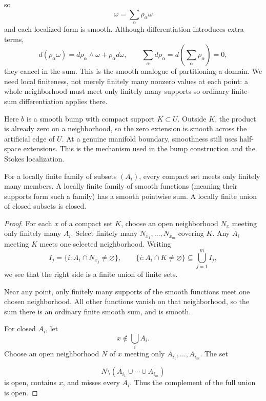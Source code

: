 so
\[
\omega=\sum_\alpha\rho_\alpha\omega
\]
 and each localized form is smooth.
Although differentiation introduces extra terms,
\[
d(\rho_\alpha\omega)=d\rho_\alpha\wedge\omega+\rho_\alpha d\omega,
\qquad \sum_\alpha d\rho_\alpha=d\left(\sum_\alpha\rho_\alpha\right)=0,
\]
they cancel in the sum. This is the smooth analogue of partitioning a
domain. We need local finiteness, not merely finitely many nonzero values
at each point: a whole neighborhood must meet only finitely many supports
so ordinary finite-sum differentiation applies there.

\begin{center}
\end{center}
Here $b$ is a smooth bump with compact support $K\subset U$.
Outside $K$, the product is already zero on a neighborhood, so the zero
extension is smooth across the artificial edge of $U$. At a genuine
manifold boundary, smoothness still uses half-space extensions. This is
the mechanism used in the bump construction and the Stokes localization.

\begin{lemma}\label{lem:local-finiteness}
For a locally finite family of subsets $(A_i)$, every compact set meets only
finitely many members. A locally finite family of smooth functions (meaning
their supports form such a family) has a smooth pointwise sum. A locally
finite union of closed subsets is closed.
\end{lemma}
\begin{proof}
For each $x$ of a compact set $K$, choose an open neighborhood $N_x$
meeting only finitely many $A_i$. Select finitely many
$N_{x_1},\ldots,N_{x_m}$ covering $K$. Any $A_i$ meeting $K$ meets
one selected neighborhood. Writing
\[
I_j=\{i:A_i\cap N_{x_j}\ne\varnothing\},\qquad
\{i:A_i\cap K\ne\varnothing\}\subseteq\bigcup_{j=1}^m I_j,
\]
we see that the right side is a finite union of finite sets.

Near any point, only finitely many supports of the smooth functions meet
one chosen neighborhood. All other functions vanish on that neighborhood,
so the sum there is an ordinary finite smooth sum, and is smooth.

For closed $A_i$, let
\[
x\notin\bigcup_iA_i.
\]
 Choose an open neighborhood
$N$ of $x$ meeting only $A_{i_1},\ldots,A_{i_m}$. The set

\[
N\setminus(A_{i_1}\cup\cdots\cup A_{i_m})
\]
 is open, contains $x$,
and misses every $A_i$. Thus the complement of the full union is open.
\end{proof}

